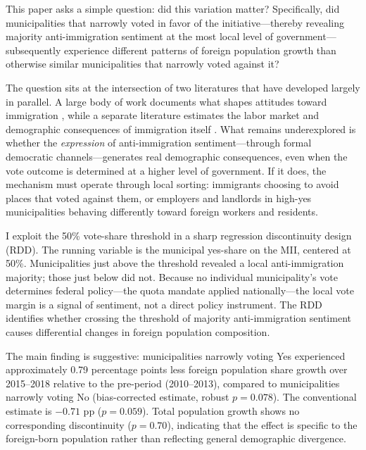 \documentclass[12pt]{article}
\begin{document}
This paper asks a simple question: did this variation matter? Specifically, did municipalities that narrowly voted in favor of the initiative---thereby revealing majority anti-immigration sentiment at the most local level of government---subsequently experience different patterns of foreign population growth than otherwise similar municipalities that narrowly voted against it?

The question sits at the intersection of two literatures that have developed largely in parallel. A large body of work documents what shapes attitudes toward immigration \citep{dustmann2007, hainmueller2014, mayda2006, card2012, alesina2023}, while a separate literature estimates the labor market and demographic consequences of immigration itself \citep{borjas2003, card2001, peri2009, foged2016, dustmann2016}. What remains underexplored is whether the \textit{expression} of anti-immigration sentiment---through formal democratic channels---generates real demographic consequences, even when the vote outcome is determined at a higher level of government. If it does, the mechanism must operate through local sorting: immigrants choosing to avoid places that voted against them, or employers and landlords in high-yes municipalities behaving differently toward foreign workers and residents.

I exploit the 50\% vote-share threshold in a sharp regression discontinuity design (RDD). The running variable is the municipal yes-share on the MII, centered at 50\%. Municipalities just above the threshold revealed a local anti-immigration majority; those just below did not. Because no individual municipality's vote determines federal policy---the quota mandate applied nationally---the local vote margin is a signal of sentiment, not a direct policy instrument. The RDD identifies whether crossing the threshold of majority anti-immigration sentiment causes differential changes in foreign population composition.

The main finding is suggestive: municipalities narrowly voting Yes experienced approximately 0.79 percentage points less foreign population share growth over 2015--2018 relative to the pre-period (2010--2013), compared to municipalities narrowly voting No (bias-corrected estimate, robust $p = 0.078$). The conventional estimate is $-0.71$ pp ($p = 0.059$). Total population growth shows no corresponding discontinuity ($p = 0.70$), indicating that the effect is specific to the foreign-born population rather than reflecting general demographic divergence.
\end{document}
